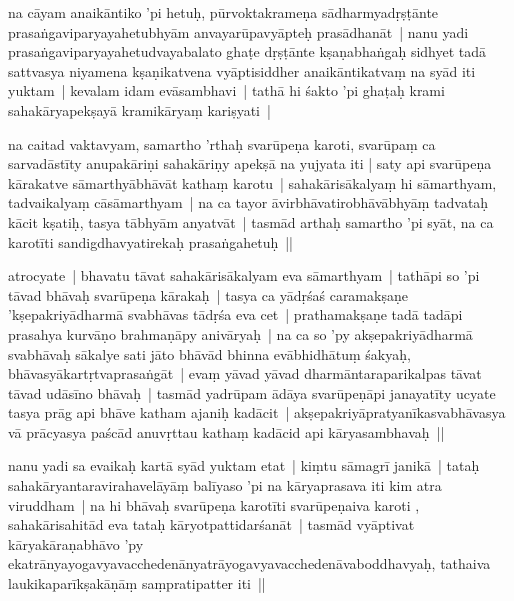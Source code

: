 \documentclass[article,12pt,a4paper]{memoir}%
\newcounter{parCount}
\begin{document}
	  
	  \pstart \leavevmode%
	\label{thakur75-74.16}na cāyam anaikāntiko 'pi hetuḥ, pūrvoktakrameṇa sādharmyadṛṣṭānte prasaṅgaviparyayahetubhyām anvayarūpavyāpteḥ prasādhanāt |\label{thakur75-74.17} nanu yadi prasaṅgaviparyayahetudvayabalato ghaṭe dṛṣṭānte kṣaṇabhaṅgaḥ sidhyet tadā sattvasya niyamena kṣaṇikatvena vyāptisiddher anaikāntikatvaṃ na syād iti yuktam | kevalam idam evāsambhavi | tathā hi śakto 'pi ghaṭaḥ krami sahakāryapekṣayā kramikāryaṃ kariṣyati |
	{}
	\pend%
      

	  
	  \pstart \leavevmode%
	\label{thakur75-74.21}na caitad vaktavyam, samartho 'rthaḥ svarūpeṇa karoti, svarūpaṃ ca sarvadāstīty anupakāriṇi sahakāriṇy apekṣā na yujyata iti | saty api svarūpeṇa kārakatve sāmarthyābhāvāt kathaṃ karotu | sahakārisākalyaṃ hi sāmarthyam, tadvaikalyaṃ cāsāmarthyam | na ca tayor āvirbhāvatirobhāvābhyāṃ tadvataḥ kācit kṣatiḥ, tasya tābhyām anyatvāt | tasmād arthaḥ samartho 'pi syāt, na ca karotīti sandigdhavyatirekaḥ prasaṅgahetuḥ ||
	{}
	\pend%
      

	  
	  \pstart \leavevmode%
	\label{thakur75-74.27}atrocyate | bhavatu tāvat sahakārisākalyam eva sāmarthyam | tathāpi so 'pi tāvad bhāvaḥ svarūpeṇa kārakaḥ |\label{thakur75-74.28} tasya ca yādṛśaś caramakṣaṇe 'kṣepakriyādharmā svabhāvas tādṛśa eva cet | \label{thakur75-74.29} prathamakṣaṇe tadā tadāpi prasahya kurvāṇo brahmaṇāpy anivāryaḥ | na ca so 'py akṣepakriyādharmā svabhāvaḥ sākalye sati jāto bhāvād bhinna evābhidhātuṃ śakyaḥ, bhāvasyākartṛtvaprasaṅgāt | evaṃ yāvad yāvad dharmāntaraparikalpas tāvat tāvad udāsīno bhāvaḥ | \label{thakur75-75.2} tasmād yadrūpam ādāya svarūpeṇāpi janayatīty ucyate tasya prāg api bhāve katham ajaniḥ kadācit | akṣepakriyāpratyanīkasvabhāvasya vā prācyasya paścād anuvṛttau kathaṃ kadācid api kāryasambhavaḥ ||
	{}
	\pend%
      

	  
	  \pstart \leavevmode%
	\label{thakur75-75.5}nanu yadi sa evaikaḥ kartā syād yuktam etat | kiṃtu sāmagrī janikā | tataḥ sahakāryantaravirahavelāyāṃ balīyaso 'pi na kāryaprasava iti kim atra viruddham | na hi bhāvaḥ svarūpeṇa karotīti svarūpeṇaiva karoti , sahakārisahitād eva tataḥ kāryotpattidarśanāt | tasmād vyāptivat kāryakāraṇabhāvo 'py ekatrānyayogavyavacchedenānyatrāyogavyavacchedenāvaboddhavyaḥ, tathaiva laukikaparīkṣakāṇāṃ saṃpratipatter iti ||
	{}
	\pend%
      
\end{document}
